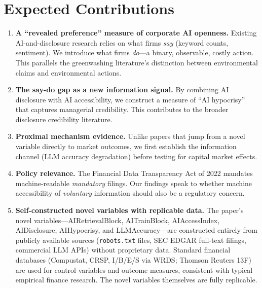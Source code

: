 \documentclass[12pt,a4paper]{article}
\begin{document}
\begin{table}[htbp]
\begin{tabularx}{\textwidth}{p{3.5cm}X}
\bottomrule
\end{tabularx}
\end{table}

\section{Expected Contributions}

\begin{enumerate}
    \item \textbf{A ``revealed preference'' measure of corporate AI openness.} Existing AI-and-disclosure research relies on what firms \emph{say} (keyword counts, sentiment). We introduce what firms \emph{do}---a binary, observable, costly action. This parallels the greenwashing literature's distinction between environmental claims and environmental actions.

    \item \textbf{The say-do gap as a new information signal.} By combining AI disclosure with AI accessibility, we construct a measure of ``AI hypocrisy'' that captures managerial credibility. This contributes to the broader disclosure credibility literature.

    \item \textbf{Proximal mechanism evidence.} Unlike papers that jump from a novel variable directly to market outcomes, we first establish the information channel (LLM accuracy degradation) before testing for capital market effects.

    \item \textbf{Policy relevance.} The Financial Data Transparency Act of 2022 mandates machine-readable \emph{mandatory} filings. Our findings speak to whether machine accessibility of \emph{voluntary} information should also be a regulatory concern.

    \item \textbf{Self-constructed novel variables with replicable data.} The paper's novel variables---AIRetrievalBlock, AITrainBlock, AIAccessIndex, AIDisclosure, AIHypocrisy, and LLMAccuracy---are constructed entirely from publicly available sources (\texttt{robots.txt} files, SEC EDGAR full-text filings, commercial LLM APIs) without proprietary data. Standard financial databases (Compustat, CRSP, I/B/E/S via WRDS; Thomson Reuters 13F) are used for control variables and outcome measures, consistent with typical empirical finance research. The novel variables themselves are fully replicable.
\end{enumerate}
\end{document}

